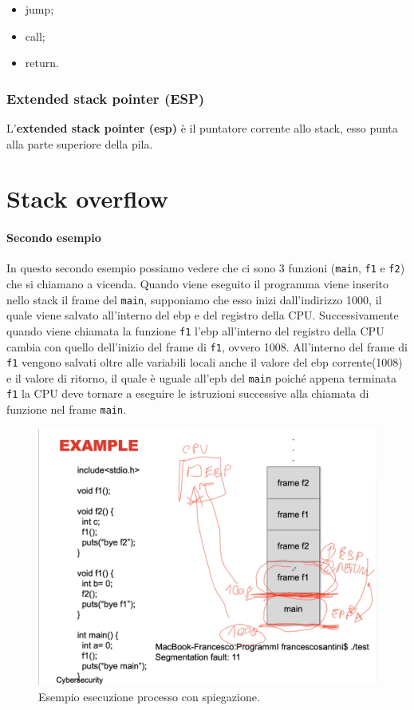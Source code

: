 \begin{itemize}
    \item jump;
    \item call;
    \item return.
\end{itemize}

\subsubsection{Extended stack pointer (ESP)}

L'\textbf{extended stack pointer (esp)} è il puntatore corrente allo stack, esso
punta alla parte superiore della pila.

\section{Stack overflow}

\paragraph{Secondo esempio}
In questo secondo esempio possiamo vedere che ci sono 3 funzioni
(\verb|main|, \verb|f1| e \verb|f2|) che si chiamano a vicenda.
Quando viene eseguito il programma viene inserito nello stack il frame del \verb|main|,
supponiamo che esso inizi dall'indirizzo 1000, il quale viene salvato all'interno
del ebp e del registro della CPU. Successivamente quando viene chiamata la
funzione \verb|f1| l'ebp all'interno del registro della CPU cambia con quello
dell'inizio del frame di \verb|f1|, ovvero 1008.
All'interno del frame di \verb|f1| vengono salvati oltre alle variabili locali
anche il valore del ebp corrente(1008) e il valore di ritorno, il quale è uguale
all'epb del \verb|main| poiché appena terminata \verb|f1| la CPU deve tornare a
eseguire le istruzioni successive alla chiamata di funzione nel frame \verb|main|.

\begin{figure}[H]
    \centering
    \includegraphics[width=13cm, keepaspectratio]{capitoli/secure_coding/img/cap_2/es_process_spiegato.png}
    \caption{Esempio esecuzione processo con spiegazione.}\label{fig:es_esec_processo2}
\end{figure}

